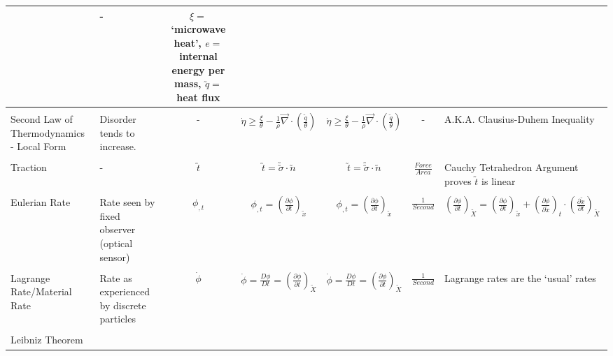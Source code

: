 \documentclass[10pt]{article}
\newcommand{\tu}[1]{\utilde{#1}}
\newcommand{\tuu}[1]{\utilde{\utilde{#1}}}
\begin{document}
\begin{center}
\begin{tabular}{l m{3in} c c c c m{5in}}
&%
-
&%
$\xi=$`microwave heat', $e=$internal energy per mass, $\utilde{q}=$heat flux
\\[1ex]
\hline
\\[-1ex]
Second Law of Thermodynamics - Local Form
&%
Disorder tends to increase. 
&%
-
&%
$ \dot{\eta} \geq \frac{\xi}{\theta}-\frac{1}{\rho}\overrightarrow{\nabla}\cdot(\frac{\utilde{q}}{\theta})$
&%
$ \dot{\eta} \geq \frac{\xi}{\theta}-\frac{1}{\rho}\overrightarrow{\nabla}\cdot(\frac{\utilde{q}}{\theta})$
&%
-
%
&%
A.K.A. Clausius-Duhem Inequality
\\[1ex]
\\[-1ex]
Traction
&%
-
&%
$ \tu{t} $
&%
$ \tu{t}=\tuu{\sigma}\cdot\tu{n} $
&%
$ \tu{t}=\tuu{\sigma}\cdot\tu{n} $
&%
$ \frac{Force}{Area} $
&%
Cauchy Tetrahedron Argument proves $\tu{t}$ is linear
\\[1ex]
\hline
\\[-1ex]
Eulerian Rate
&%
Rate seen by fixed observer (optical sensor)
&%
$ \phi_{,t} $
&%
$ \phi_{,t}=(\frac{\partial \phi}{\partial t})_{\tu{x}} $
&%
$ \phi_{,t}=(\frac{\partial \phi}{\partial t})_{\tu{x}} $
&%
$ \frac{1}{Second} $
&%
$(\frac{\partial \phi}{\partial t})_{\tu{X}} = (\frac{\partial \phi}{\partial t})_{\tu{x}}+(\frac{\partial \phi}{\partial \tu{x}})_{t}\cdot(\frac{\partial \tu{x}}{\partial t})_{\tu{X}} $
\\[1ex]
\hline
\\[-1ex]
Lagrange Rate/Material Rate
&%
Rate as experienced by discrete particles
&%
$ \dot{\phi} $
&%
$ \dot{\phi} = \frac{D\phi}{Dt} = (\frac{\partial \phi}{\partial t})_{\tu{X}} $
&%
$ \dot{\phi} = \frac{D\phi}{Dt} = (\frac{\partial \phi}{\partial t})_{\tu{X}} $
&%
$ \frac{1}{Second} $
&%
Lagrange rates are the `usual' rates
\\[1ex]
\hline
\\[-1ex]
Leibniz Theorem
&%

\end{tabular}
\end{center}
\end{document}
